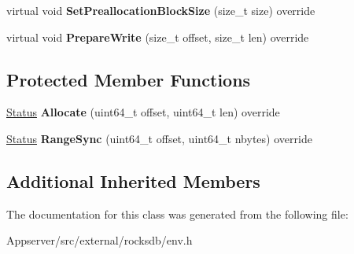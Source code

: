\begin{DoxyCompactItemize}
\item 
virtual void {\bfseries Set\+Preallocation\+Block\+Size} (size\+\_\+t size) override\hypertarget{classrocksdb_1_1WritableFileWrapper_a6b8ebf3109cef615aa9ff256271bcf3e}{}\label{classrocksdb_1_1WritableFileWrapper_a6b8ebf3109cef615aa9ff256271bcf3e}

\item 
virtual void {\bfseries Prepare\+Write} (size\+\_\+t offset, size\+\_\+t len) override\hypertarget{classrocksdb_1_1WritableFileWrapper_acccf08918756d86d258535c9644f3997}{}\label{classrocksdb_1_1WritableFileWrapper_acccf08918756d86d258535c9644f3997}

\end{DoxyCompactItemize}
\subsection*{Protected Member Functions}
\begin{DoxyCompactItemize}
\item 
\hyperlink{classrocksdb_1_1Status}{Status} {\bfseries Allocate} (uint64\+\_\+t offset, uint64\+\_\+t len) override\hypertarget{classrocksdb_1_1WritableFileWrapper_a2cc3c1185744f3306493af943ee1aee4}{}\label{classrocksdb_1_1WritableFileWrapper_a2cc3c1185744f3306493af943ee1aee4}

\item 
\hyperlink{classrocksdb_1_1Status}{Status} {\bfseries Range\+Sync} (uint64\+\_\+t offset, uint64\+\_\+t nbytes) override\hypertarget{classrocksdb_1_1WritableFileWrapper_a3790940cd4f1abef886557ab5b533ad0}{}\label{classrocksdb_1_1WritableFileWrapper_a3790940cd4f1abef886557ab5b533ad0}

\end{DoxyCompactItemize}
\subsection*{Additional Inherited Members}


The documentation for this class was generated from the following file\+:\begin{DoxyCompactItemize}
\item 
Appserver/src/external/rocksdb/env.\+h\end{DoxyCompactItemize}
